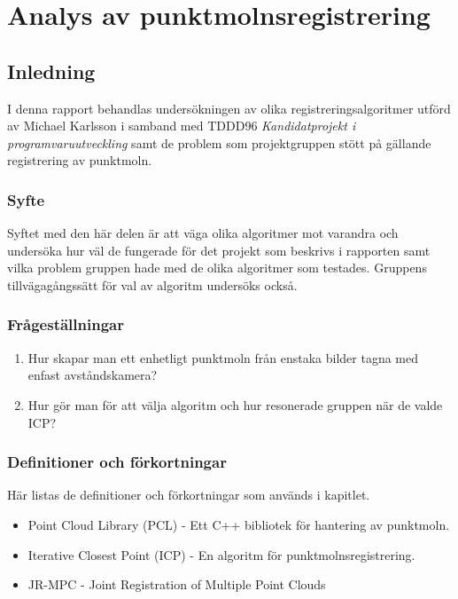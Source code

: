 \chapter{Analys av punktmolnsregistrering}
\label{cha:indiv-report-karlsson}


\section{Inledning}
\label{sec:introduction-karlsson}

I denna rapport behandlas undersökningen av olika registreringsalgoritmer utförd av Michael Karlsson i samband med TDDD96 \textit{Kandidatprojekt i programvaruutveckling} samt de problem som projektgruppen stött på gällande registrering av punktmoln.

\subsection{Syfte}
\label{sec:purpose-karlsson}

Syftet med den här delen är att väga olika algoritmer mot varandra och undersöka hur väl de fungerade för det projekt som beskrivs i rapporten samt vilka problem gruppen hade med de olika algoritmer som testades. Gruppens tillvägagångssätt för val av algoritm undersöks också.


\subsection{Frågeställningar}
\label{sec:issue-karlsson}

\begin{enumerate}
	\item Hur skapar man ett enhetligt punktmoln från enstaka bilder tagna med en\newline  fast avståndskamera?
	\item Hur gör man för att välja algoritm och hur resonerade gruppen när de valde ICP?	
\end{enumerate}

\subsection{Definitioner och förkortningar}
\label{sec:definitions-acronyms-karlsson}

Här listas de definitioner och förkortningar som används i kapitlet.

\begin{itemize}
	\item Point Cloud Library (PCL) \cite{pcl_home} - Ett C++ bibliotek för hantering av punktmoln.
	\item Iterative Closest Point (ICP) - En algoritm för punktmolnsregistrering.
	\item JR-MPC \cite{Evangelidis-ECCV-2014} - Joint Registration of Multiple Point Clouds
\end{itemize}


